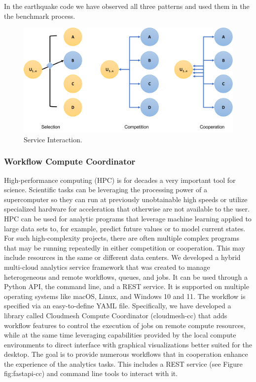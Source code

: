 \documentclass[utf8]{FrontiersinVancouver} %
\begin{document}
In the earthquake code we have observed all three patterns and used
them in the the benchmark process.

\begin{figure}[htb]
\centering\includegraphics[width=0.75\columnwidth]{images/processes-nist.pdf}
\caption{Service Interaction.}
\label{fig:service-interaction}
\end{figure}




\subsubsection{Workflow Compute Coordinator}
\label{sec:workflow-cc}

High-performance computing (HPC) is for decades a very important tool
for science. Scientific tasks can be leveraging the processing power
of a supercomputer so they can run at previously unobtainable high
speeds or utilize specialized hardware for acceleration that otherwise
are not available to the user. HPC can be used for analytic programs
that leverage machine learning applied to large data sets to, for
example, predict future values or to model current states. For such
high-complexity projects, there are often multiple complex programs
that may be running repeatedly in either competition or cooperation.
This may include resources in the same or different data centers. We
developed a hybrid multi-cloud analytics service framework that was
created to manage heterogeneous and remote workflows, queues, and
jobs.  It can be used through a Python API, the command line, and a
REST service. It is supported on multiple operating systems like
macOS, Linux, and Windows 10 and 11.  The workflow is specified via an
easy-to-define YAML file.  Specifically, we have developed a library
called Cloudmesh Compute Coordinator (cloudmesh-cc)
\citep{las-22-arxiv-workflow-cc} that adds workflow features to
control the execution of jobs on remote compute resources, while at
the same time leveraging capabilities provided by the local compute
environments to direct interface with graphical visualizations better
suited for the desktop. The goal is to provide numerous workflows that
in cooperation enhance the experience of the analytics tasks. This
includes a REST service (see Figure {fig:fastapi-cc}) and command line
tools to interact with it.
\end{document}
